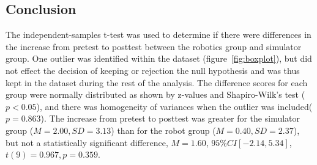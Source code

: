 \subsection{Conclusion}
The independent-samples t-test was used to determine if there were differences in the increase from pretest to posttest between the robotics group and simulator group. One outlier was identified within the dataset (figure~\ref{fig:boxplot}), but did not effect the decision of keeping or rejection the null hypothesis and was thus kept in the dataset during the rest of the analysis. The difference scores for each group were normally distributed as shown by z-values and Shapiro-Wilk's test ($p < 0.05$), and there was homogeneity of variances when the outlier was included($p = 0.863$). The increase from pretest to posttest was greater for the simulator group ($M = 2.00, SD = 3.13$) than for the robot group ($M = 0.40, SD = 2.37$), but not a statistically significant difference, $M = 1.60$, $95\% CI [-2.14, 5.34]$, $t(9) = 0.967, p = 0.359$.


